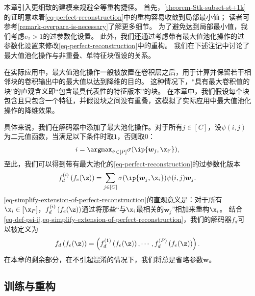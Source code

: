 本章引入更细致的建模来规避全等重构捷径。
首先，\cref{theorem-Stk-subset-st+1k}的证明意味着\cref{eq-perfect-reconstruction}中的重构容易收敛到局部最小值；
读者可参考\cref{remark-overpara-is-necessary}了解更多细节。
为了避免达到局部最小值，我们考虑$c_2 > 1$的过参数化设置。
此外，我们还通过考虑带有最大值池化操作的过参数化设置来修改\cref{eq-perfect-reconstruction}中的重构。
我们在下述注记中讨论了最大值池化操作与非重叠、单特征块假设的关系。

\begin{remark}
    \label{remark: max pooling and non overlapping patches}
    在实际应用中，最大值池化操作一般被放置在卷积层之后，用于计算并保留若干相邻块的卷积输出中的最大值以达到降维的目的。
    这种情况下，“具有最大卷积值的块”的直观含义即“包含最具代表性的特征版本”的块。    
    在本章中，我们假设每个块包含且只包含一个特征，并假设块之间没有重叠，这模拟了实际应用中最大值池化操作的降维效果。
\end{remark}

具体来说，我们在解码器中添加了最大池化操作。对于所有$ j \in [C]$，设$\psi(i,j)$为二元值函数，当满足以下条件时取$1$，否则取$0$：
\begin{equation}\label{eq-def-psi-ij}
    i = \argmax_{i^{\prime} \in [P]} \sigma(\ip{\boldsymbol{w}_j,\x_{i^{\prime}}}),
\end{equation}
至此，我们可以得到带有最大池化的\cref{eq-perfect-reconstruction}的过参数化版本
\begin{equation}\label{eq-simplify-extension-of-perfect-reconstruction}
    f_d^{(i)} \left(f_e(\z) \right) = \sum_{j \in [C]} \sigma(\ip{\boldsymbol{w}_j,\x_i}) \psi(i,j) \boldsymbol{w}_j.
\end{equation}
\cref{eq-simplify-extension-of-perfect-reconstruction}的直观意义是：对于所有$ \x_i \in [\x_P]$，$f_d^{(i)} \left(f_e(\z) \right)$通过将那些“与$\x_i$最相关的$\boldsymbol{w}_j$”相加来重构$\x_i$。
结合\cref{eq-def-psi-ij,eq-simplify-extension-of-perfect-reconstruction}，我们的解码器$f_d$可以被定义为
\begin{equation}\label{eq-def-phi-d}
f_d \left(f_e(\z) \right)
= \left( f_d^{(1)} \left(f_e(\z) \right) , \cdots , f_d^{(P)}\left(f_e(\z) \right) \right).
\end{equation}
在本章的剩余部分，在不引起混淆的情况下，我们将总是省略参数$\boldsymbol{w}$。

\subsection{训练与重构}\label{subsec:RBAD-training-paradigms}

